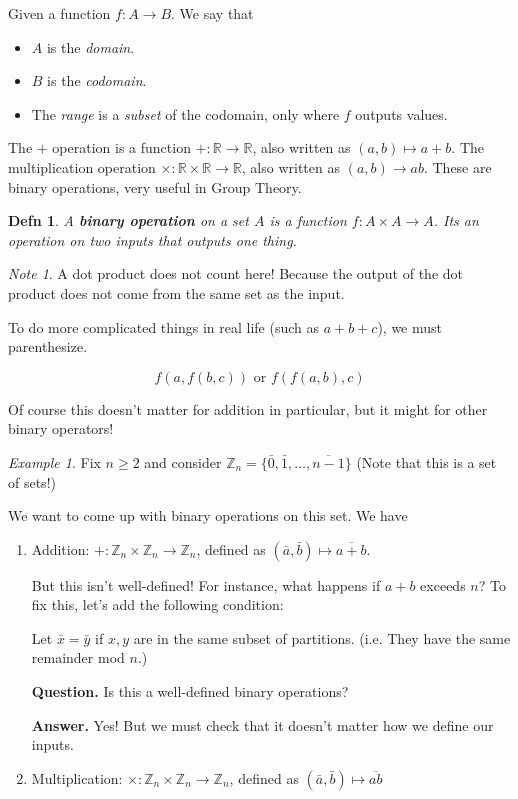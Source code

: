 \documentclass[12pt]{article}
\def\Z{{\mathbb Z}}
\def\R{{\mathbb R}}
\newcommand{\qna}[2]{
  {\bf Question.} #1

  {\bf Answer.} #2
}
\newtheorem{definition}{Defn}
\theoremstyle{remark}
\theoremstyle{remark}
\theoremstyle{remark}
\newtheorem{example}{Example}
\theoremstyle{remark}
\theoremstyle{remark}
\newtheorem*{note}{Note}
\begin{document}
Given a function $f: A \to B$. We say that

\begin{itemize}
	\item $A$ is the {\it domain}.
	\item $B$ is the {\it codomain}.
	\item The {\it range} is a {\it subset} of the codomain, only where $f$
	      outputs values.
\end{itemize}

The $+$ operation is a function $+: \R \to \R$, also written as $(a, b)
	\mapsto a + b$. The multiplication operation $\times: \R \times \R \to \R$,
also written as $(a, b) \to ab$. These are binary operations, very useful in
Group Theory.

\begin{definition}
	A {\bf binary operation} on a set $A$ is a function $f: A \times A \to A$.
	Its an operation on two inputs that outputs one thing.
\end{definition}

\begin{note}
	A dot product does not count here! Because the output of the dot
	product does not come from the same set as the input.
\end{note}

To do more complicated things in real life (such as $a + b + c$), we must
parenthesize.

\[
	f(a, f(b, c)) \text{ or } f(f(a, b), c)
\]

Of course this doesn't matter for addition in particular, but it might for
other binary operators!

\begin{example}
	Fix $n \ge 2$ and consider $\Z_n = \{\bar 0, \bar 1, \dots, \overline{n - 1}
		\}$ (Note that this is a set of sets!)

	We want to come up with binary operations on this set. We have

	\begin{enumerate}
		\item Addition: $+: \Z_n \times \Z_n \to \Z_n$, defined as $(\bar a, \bar
			      b) \mapsto \overline{a + b}$.

		      But this isn't well-defined! For instance, what happens if $a + b$
		      exceeds $n$? To fix this, let's add the following condition:

		      Let $\bar x = \bar y$ if $x, y$ are in the same subset of partitions.
		      (i.e. They have the same remainder mod $n$.)

		      \qna {
			      Is this a well-defined binary operations?
		      }
		      {
			      Yes! But we must check that it doesn't matter how we define our
			      inputs.
		      }

		\item Multiplication: $\times: \Z_n \times \Z_n \to \Z_n$, defined as
		      $(\bar a, \bar b) \mapsto \overline{ab}$
	\end{enumerate}
\end{example}
\end{document}
